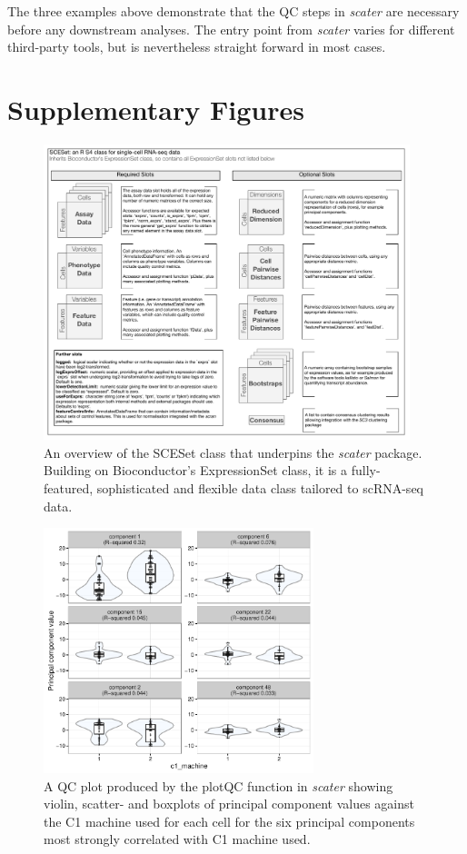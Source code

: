 \documentclass[10pt,letterpaper]{article}
\begin{document}
The three examples above demonstrate that the QC steps in \emph{scater} are necessary before any downstream analyses. The entry point from \emph{scater} varies for different third-party tools, but is nevertheless straight forward in most cases.


\section*{Supplementary Figures}


\begin{figure}[!htpb]%
\centerline{\includegraphics[width=0.95\textwidth]{figures/sceset_outline.pdf}}
\caption{An overview of the SCESet class that underpins the \emph{scater} package. Building on Bioconductor's ExpressionSet class, it is a fully-featured, sophisticated and flexible data class tailored to scRNA-seq data.}\label{fig:02}
\end{figure}


\begin{figure}[!tpb]
\centerline{\includegraphics[width=0.7\textwidth]{figures/find-pcs_c1_machine.pdf}}
\caption{A QC plot produced by the plotQC function in \emph{scater} showing violin, scatter- and boxplots of principal component values against the C1 machine used for each cell for the six principal components most strongly correlated with C1 machine used.}\label{fig:plotqc-c1-machine}
\end{figure}
\end{document}
